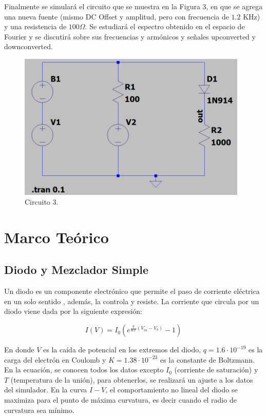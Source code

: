 \documentclass[letterpaper,oneside]{article}
\begin{document}
Finalmente se simulará el circuito que se muestra en la Figura 3, en que se agrega una nueva fuente (mismo DC Offset y amplitud, pero con frecuencia de $1.2$ KHz) y una resistencia de $100\Omega$. Se estudiará el espectro obtenido en el espacio de Fourier y se discutirá sobre sus frecuencias y armónicos y señales upconverted y downconverted.

\begin{figure}
  \centering
  \includegraphics[height=7cm]{../graficos/circuito4.png}
  \caption{Circuito 3.}
\end{figure}

\section{Marco Teórico}
\subsection{Diodo y Mezclador Simple}
Un diodo es un componente electrónico que permite el paso de corriente eléctrica en un solo sentido , además, la controla y resiste. La corriente que circula por un diodo viene dada por la siguiente expresión:

\begin{equation}
    I(V) = I_0(e^{\frac{q}{KT}(V_{in}-V_{b})}-1)
\end{equation}

En donde $V$ es la caída de potencial en los extremos del diodo, $q=1.6 \cdot 10^{-19}$ es la carga del electrón en Coulomb y $K= 1.38 \cdot 10^{-23}$ es la constante de Boltzmann. En la ecuación, se conocen todos los datos excepto $I_0$ (corriente de saturación) y $T$ (temperatura de la unión), para obtenerlos, se realizará un ajuste a los datos del simulador. En la curva $I-V$, el comportamiento no lineal del diodo se maximiza para el punto de máxima curvatura, es decir cuando el radio de curvatura sea mínimo.
\end{document}
